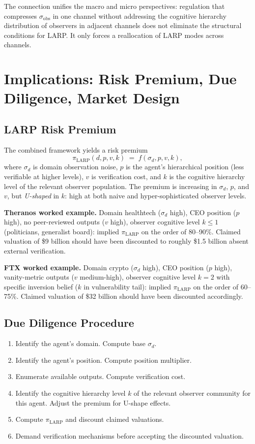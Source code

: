 \documentclass[11pt]{article}
\begin{document}
The connection unifies the macro and micro perspectives: regulation that compresses $\sigma_{\mathrm{obs}}$ in one channel without addressing the cognitive hierarchy distribution of observers in adjacent channels does not eliminate the structural conditions for LARP. It only forces a reallocation of LARP modes across channels.

\section{Implications: Risk Premium, Due Diligence, Market Design}

\subsection{LARP Risk Premium}

The combined framework yields a risk premium
\[
\pi_{\mathrm{LARP}}(d, p, v, k) \;=\; f(\sigma_d, p, v, k),
\]
where $\sigma_d$ is domain observation noise, $p$ is the agent's hierarchical position (less verifiable at higher levels), $v$ is verification cost, and $k$ is the cognitive hierarchy level of the relevant observer population. The premium is increasing in $\sigma_d$, $p$, and $v$, but \emph{U-shaped} in $k$: high at both naive and hyper-sophisticated observer levels.

\medskip\noindent\textbf{Theranos worked example.} Domain healthtech ($\sigma_d$ high), CEO position ($p$ high), no peer-reviewed outputs ($v$ high), observer cognitive level $k \leq 1$ (politicians, generalist board): implied $\pi_{\mathrm{LARP}}$ on the order of 80--90\%. Claimed valuation of \$9 billion should have been discounted to roughly \$1.5 billion absent external verification.

\medskip\noindent\textbf{FTX worked example.} Domain crypto ($\sigma_d$ high), CEO position ($p$ high), vanity-metric outputs ($v$ medium-high), observer cognitive level $k = 2$ with specific inversion belief ($k$ in vulnerability tail): implied $\pi_{\mathrm{LARP}}$ on the order of 60--75\%. Claimed valuation of \$32 billion should have been discounted accordingly.

\subsection{Due Diligence Procedure}

\begin{enumerate}
\item Identify the agent's domain. Compute base $\sigma_d$.
\item Identify the agent's position. Compute position multiplier.
\item Enumerate available outputs. Compute verification cost.
\item Identify the cognitive hierarchy level $k$ of the relevant observer community for this agent. Adjust the premium for U-shape effects.
\item Compute $\pi_{\mathrm{LARP}}$ and discount claimed valuations.
\item Demand verification mechanisms before accepting the discounted valuation.
\end{enumerate}
\end{document}

